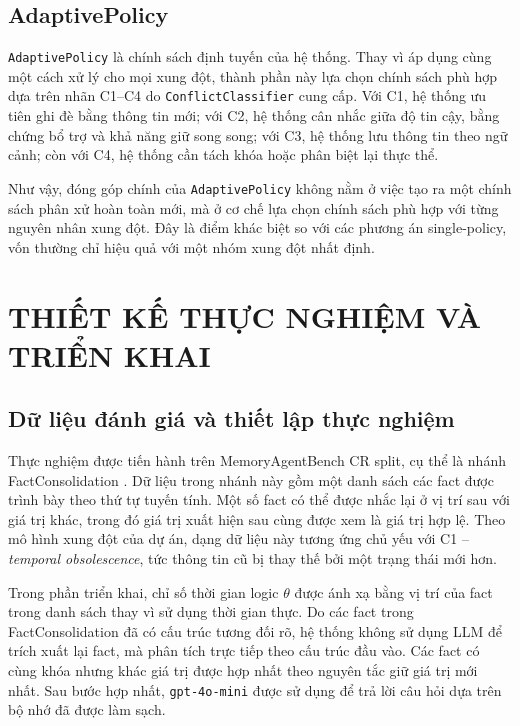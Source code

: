 \documentclass[12pt,a4paper]{article}
\newcommand{\code}[1]{\texttt{#1}}
\begin{document}
\subsection{AdaptivePolicy}

\code{AdaptivePolicy} là chính sách định tuyến của hệ thống. Thay vì áp dụng cùng một cách xử lý cho mọi xung đột, thành phần này lựa chọn chính sách phù hợp dựa trên nhãn C1--C4 do \code{ConflictClassifier} cung cấp. Với C1, hệ thống ưu tiên ghi đè bằng thông tin mới; với C2, hệ thống cân nhắc giữa độ tin cậy, bằng chứng bổ trợ và khả năng giữ song song; với C3, hệ thống lưu thông tin theo ngữ cảnh; còn với C4, hệ thống cần tách khóa hoặc phân biệt lại thực thể.

Như vậy, đóng góp chính của \code{AdaptivePolicy} không nằm ở việc tạo ra một chính sách phân xử hoàn toàn mới, mà ở cơ chế lựa chọn chính sách phù hợp với từng nguyên nhân xung đột. Đây là điểm khác biệt so với các phương án single-policy, vốn thường chỉ hiệu quả với một nhóm xung đột nhất định.



\section{THIẾT KẾ THỰC NGHIỆM VÀ TRIỂN KHAI}

\subsection{Dữ liệu đánh giá và thiết lập thực nghiệm}

Thực nghiệm được tiến hành trên MemoryAgentBench CR split, cụ thể là nhánh FactConsolidation \cite{memoryagentbench,memoryagentbench_dataset}. Dữ liệu trong nhánh này gồm một danh sách các fact được trình bày theo thứ tự tuyến tính. Một số fact có thể được nhắc lại ở vị trí sau với giá trị khác, trong đó giá trị xuất hiện sau cùng được xem là giá trị hợp lệ. Theo mô hình xung đột của dự án, dạng dữ liệu này tương ứng chủ yếu với C1 -- \textit{temporal obsolescence}, tức thông tin cũ bị thay thế bởi một trạng thái mới hơn.

Trong phần triển khai, chỉ số thời gian logic \(\theta\) được ánh xạ bằng vị trí của fact trong danh sách thay vì sử dụng thời gian thực. Do các fact trong FactConsolidation đã có cấu trúc tương đối rõ, hệ thống không sử dụng LLM để trích xuất lại fact, mà phân tích trực tiếp theo cấu trúc đầu vào. Các fact có cùng khóa nhưng khác giá trị được hợp nhất theo nguyên tắc giữ giá trị mới nhất. Sau bước hợp nhất, \code{gpt-4o-mini} được sử dụng để trả lời câu hỏi dựa trên bộ nhớ đã được làm sạch.
\end{document}
